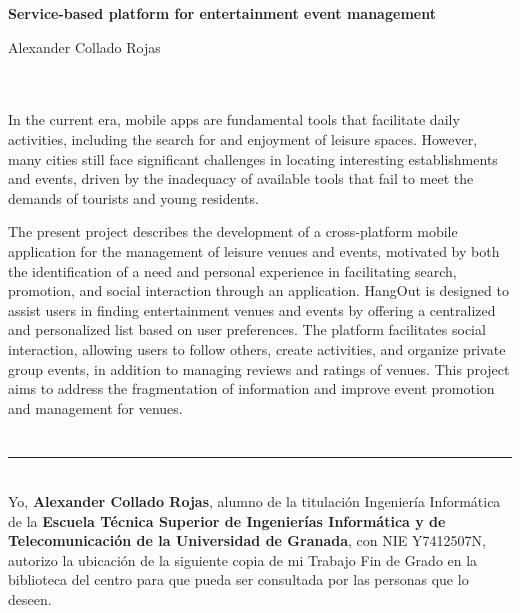 \thispagestyle{empty}


\begin{center}
    {\large\bfseries Service-based platform for entertainment event management}\\
\end{center}
\begin{center}
    Alexander Collado Rojas\\
\end{center}
\\

\vspace{0.7cm}
\\

In the current era, mobile apps are fundamental tools that facilitate daily activities, including the search for and enjoyment of leisure spaces. However, many cities still face significant challenges in locating interesting establishments and events, driven by the inadequacy of available tools that fail to meet the demands of tourists and young residents.

The present project describes the development of a cross-platform mobile application for the management of leisure venues and events, motivated by both the identification of a need and personal experience in facilitating search, promotion, and social interaction through an application. HangOut is designed to assist users in finding entertainment venues and events by offering a centralized and personalized list based on user preferences. The platform facilitates social interaction, allowing users to follow others, create activities, and organize private group events, in addition to managing reviews and ratings of venues. This project aims to address the fragmentation of information and improve event promotion and management for venues.

\chapter*{}
\thispagestyle{empty}

\noindent\rule[-1ex]{\textwidth}{2pt}\\[4.5ex]

Yo, \textbf{Alexander Collado Rojas}, alumno de la titulación Ingeniería Informática de la \textbf{Escuela Técnica Superior
    de Ingenierías Informática y de Telecomunicación de la Universidad de Granada}, con NIE Y7412507N, autorizo la
ubicación de la siguiente copia de mi Trabajo Fin de Grado en la biblioteca del centro para que pueda ser
consultada por las personas que lo deseen.

